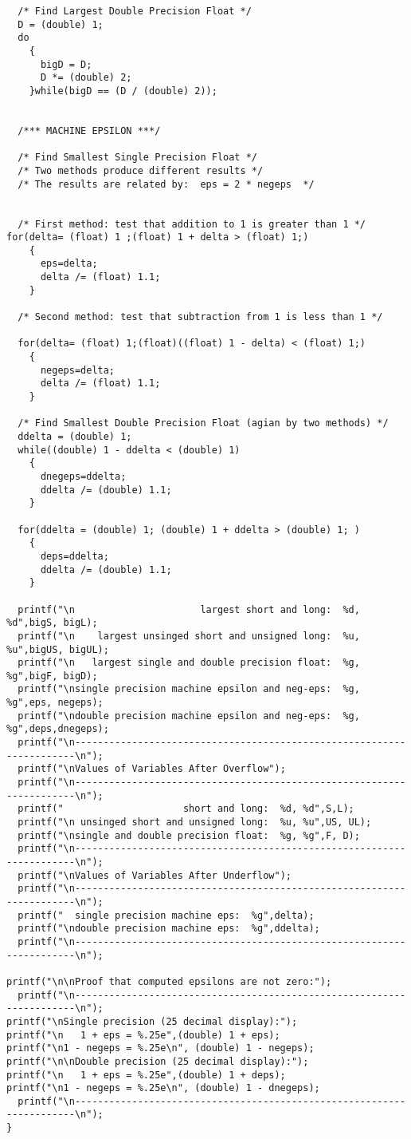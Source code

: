 \documentclass{article}
\begin{document}
\begin{verbatim}
  /* Find Largest Double Precision Float */
  D = (double) 1;
  do
    {
      bigD = D;
      D *= (double) 2;
    }while(bigD == (D / (double) 2)); 


  /*** MACHINE EPSILON ***/

  /* Find Smallest Single Precision Float */
  /* Two methods produce different results */
  /* The results are related by:  eps = 2 * negeps  */


  /* First method: test that addition to 1 is greater than 1 */
for(delta= (float) 1 ;(float) 1 + delta > (float) 1;)
    {
      eps=delta;
      delta /= (float) 1.1;		
    }

  /* Second method: test that subtraction from 1 is less than 1 */

  for(delta= (float) 1;(float)((float) 1 - delta) < (float) 1;)
    {
      negeps=delta;
      delta /= (float) 1.1;
    }

  /* Find Smallest Double Precision Float (agian by two methods) */
  ddelta = (double) 1;
  while((double) 1 - ddelta < (double) 1)
    {
      dnegeps=ddelta;
      ddelta /= (double) 1.1;		
    }

  for(ddelta = (double) 1; (double) 1 + ddelta > (double) 1; )
    {
      deps=ddelta;
      ddelta /= (double) 1.1;		
    }

  printf("\n                      largest short and long:  %d, %d",bigS, bigL);
  printf("\n    largest unsinged short and unsigned long:  %u, %u",bigUS, bigUL);
  printf("\n   largest single and double precision float:  %g, %g",bigF, bigD);
  printf("\nsingle precision machine epsilon and neg-eps:  %g, %g",eps, negeps);
  printf("\ndouble precision machine epsilon and neg-eps:  %g, %g",deps,dnegeps);
  printf("\n----------------------------------------------------------------------\n");
  printf("\nValues of Variables After Overflow");
  printf("\n----------------------------------------------------------------------\n");
  printf("                     short and long:  %d, %d",S,L);
  printf("\n unsinged short and unsigned long:  %u, %u",US, UL);
  printf("\nsingle and double precision float:  %g, %g",F, D);
  printf("\n----------------------------------------------------------------------\n");
  printf("\nValues of Variables After Underflow");
  printf("\n----------------------------------------------------------------------\n");
  printf("  single precision machine eps:  %g",delta);
  printf("\ndouble precision machine eps:  %g",ddelta);
  printf("\n----------------------------------------------------------------------\n");

printf("\n\nProof that computed epsilons are not zero:");
  printf("\n----------------------------------------------------------------------\n");
printf("\nSingle precision (25 decimal display):");
printf("\n   1 + eps = %.25e",(double) 1 + eps);
printf("\n1 - negeps = %.25e\n", (double) 1 - negeps);
printf("\n\nDouble precision (25 decimal display):");
printf("\n   1 + eps = %.25e",(double) 1 + deps);
printf("\n1 - negeps = %.25e\n", (double) 1 - dnegeps);
  printf("\n----------------------------------------------------------------------\n");
}
\end{verbatim}
\end{document}
